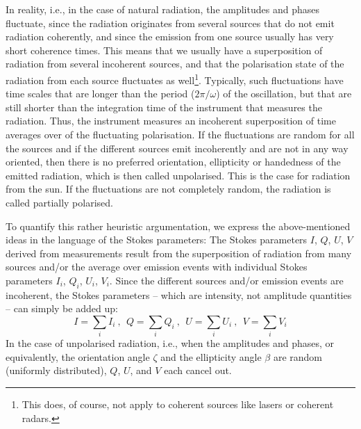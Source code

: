 In reality, i.e., in the case of natural radiation, 
the amplitudes and phases fluctuate, since the radiation
originates from several sources that do not emit radiation coherently,
and since the emission from one source usually has very short
coherence times. This
means that we usually have a superposition of radiation from several incoherent
sources, and that the polarisation state of the radiation from each
source fluctuates as well\footnote{This does, of course, not apply to
  coherent sources like lasers or coherent radars.}. 
Typically, such fluctuations have time scales that are longer than the
period ($2\pi/\omega$) of the oscillation, but that are still shorter
than the integration time of the instrument that measures the
radiation. Thus, the instrument measures an incoherent
 superposition of time averages
over of the fluctuating polarisation. If the fluctuations are
random for all the sources and if the different sources emit 
incoherently and are not in any way oriented, then there is no preferred
orientation, ellipticity or handedness of the emitted radiation, which
is then called unpolarised. This is the case for radiation from the sun.
If the fluctuations are not completely random, the
radiation is called partially polarised.

To quantify this rather heuristic argumentation, we express the
above-mentioned ideas in the language of the Stokes parameters: The
Stokes parameters $I$, $Q$, $U$, $V$ derived from measurements result
from the superposition of radiation from many sources and/or the
average over emission events with individual Stokes parameters $I_i$,
$Q_i$, $U_i$, $V_i$.  Since the different sources and/or emission events are
incoherent, the Stokes parameters -- which are intensity, not
amplitude quantities -- can simply be added up:
\begin{equation}
  \label{eq:polarization:summed_stokes}
  I = \sum_i I_i \: \mbox{, }\; 
  Q = \sum_i Q_i \: \mbox{, }\; 
  U = \sum_i U_i \: \mbox{, }\; 
  V = \sum_i V_i
\end{equation}
In the case of unpolarised radiation, i.e., when the amplitudes and
phases, or equivalently, the orientation angle $\zeta$ and the
ellipticity angle $\beta$ are random (uniformly distributed), 
$Q$, $U$, and $V$
each cancel out.


